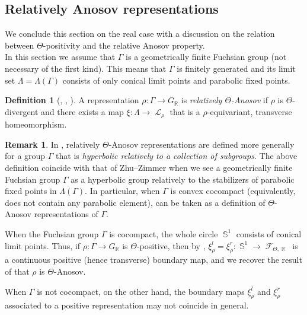 \documentclass{amsart}
\theoremstyle{plain}
\theoremstyle{definition}
\newtheorem{definition}[proposition]{Definition}
\newtheorem{remark}[proposition]{Remark}
\DeclareMathOperator{\Fc}{\mathcal{F}}
\DeclareMathOperator{\Lc}{\mathcal{L}}
\DeclareMathOperator{\Rb}{{\mathbb{R}}}
\DeclareMathOperator{\Sb}{\mathbb{S}}
\newcommand{\1}{\mathbf{1}}
\begin{document}
\subsection{Relatively Anosov representations}

We conclude this section on the real case with a discussion on the relation between $\Theta$-positivity and the relative Anosov property.\\


In this section we assume that $\Gamma$ is a geometrically finite Fuchsian group (not necessary of the first kind).
This means that $\Gamma$ is finitely generated and its limit set $\Lambda=\Lambda(\Gamma)$ consists of only conical limit points and parabolic fixed points.

\begin{definition}[{\cite[Definition~7.1]{KL}, \cite{CZZ}, \cite[Definition~1.1]{ZZ1}}]\label{def: Relatively Anosov}
    A representation $\rho\colon\Gamma\to G_{\Rb}$ is \emph{relatively $\Theta$-Anosov} if $\rho$ is $\Theta$-divergent and there exists a map $\xi \colon \Lambda \to \Lc_\rho$ that is a $\rho$-equivariant, transverse homeomorphism.
\end{definition}

\begin{remark}
    In \cite{ZZ1}, relatively $\Theta$-Anosov representations are defined more generally for a group $\Gamma$ that is \emph{hyperbolic relatively to a collection of subgroups}. The above definition coincide with that of Zhu--Zimmer when we see a geometrically finite Fuchsian group $\Gamma$ as a hyperbolic group relatively to the stabilizers of parabolic fixed points in $\Lambda(\Gamma)$. In particular, when $\Gamma$ is convex cocompact (equivalently, does not contain any parabolic element),  can be taken as a definition of $\Theta$-Anosov representations of $\Gamma$.
\end{remark}

When the Fuchsian group $\Gamma$ is cocompact, the whole circle $\Sb^1$ consists of conical limit points. Thus, if $\rho:\Gamma\to G_{\Rb}$ is $\Theta$-positive, then by , $\xi_\rho^l = \xi_\rho^r \colon \Sb^1 \to \Fc_{\Theta,\Rb}$ is a continuous positive (hence transverse) boundary map, and we recover the result of \cite[Theorem~A]{GLW} that $\rho$ is $\Theta$-Anosov.

When $\Gamma$ is not cocompact, on the other hand, the boundary maps $\xi^l_\rho$ and $\xi^r_\rho$ associated to a positive representation may not coincide in general.
\end{document}
